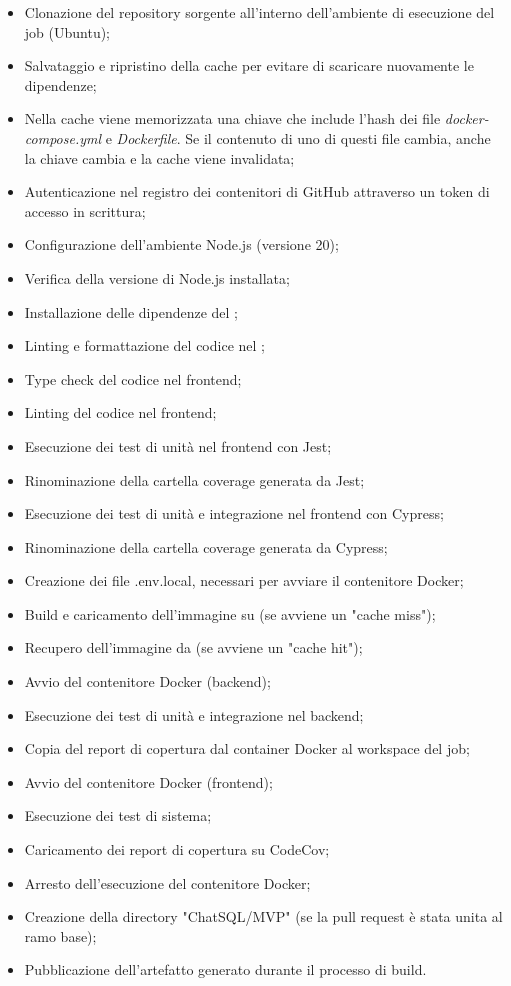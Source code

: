 \begin{itemize}
\begin{itemize}
    \item Clonazione del repository sorgente all'interno dell'ambiente di esecuzione del job (Ubuntu);
    \item Salvataggio e ripristino della cache per evitare di scaricare nuovamente le dipendenze;
    \item Nella cache viene memorizzata una chiave che include l'hash dei file \emph{docker-compose.yml} e \emph{Dockerfile}. Se il contenuto di uno di questi file cambia, anche la chiave cambia e la cache viene invalidata;
    \item Autenticazione nel registro dei contenitori di GitHub attraverso un token di accesso in scrittura;
    \item Configurazione dell'ambiente Node.js (versione 20);
    \item Verifica della versione di Node.js installata;
    \item Installazione delle dipendenze del ;
    \item Linting e formattazione del codice nel ;
    \item Type check del codice nel frontend;
    \item Linting del codice nel frontend;
    \item Esecuzione dei test di unità nel frontend con Jest;
    \item Rinominazione della cartella coverage generata da Jest;
    \item Esecuzione dei test di unità e integrazione nel frontend con Cypress;
    \item Rinominazione della cartella coverage generata da Cypress;
    \item Creazione dei file .env.local, necessari per avviare il contenitore Docker;
    \item Build e caricamento dell'immagine su  (se avviene un "cache miss");
    \item Recupero dell'immagine da  (se avviene un "cache hit");
    \item Avvio del contenitore Docker (backend);
    \item Esecuzione dei test di unità e integrazione nel backend;
    \item Copia del report di copertura dal container Docker al workspace del job;
    \item Avvio del contenitore Docker (frontend);
    \item Esecuzione dei test di sistema;
    \item Caricamento dei report di copertura su CodeCov;
    \item Arresto dell'esecuzione del contenitore Docker;
    \item Creazione della directory "ChatSQL/MVP" (se la pull request è stata unita al ramo base);
    \item Pubblicazione dell'artefatto generato durante il processo di build.
  \end{itemize}
\end{itemize}

